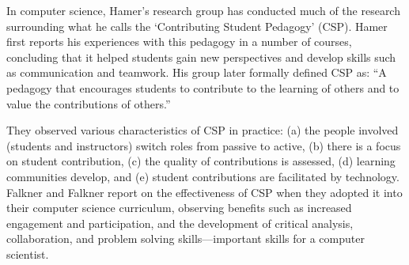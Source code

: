 
In computer science, Hamer's research group has conducted much of the research surrounding what he calls the `Contributing Student Pedagogy' (CSP). Hamer first reports his experiences \cite{hamer2006some} with this pedagogy in a number of courses, concluding that it helped students gain new perspectives and develop skills such as communication and teamwork. His group later formally defined CSP \cite{hamer2008contributing} as: ``A pedagogy that encourages students to contribute to the learning of others and to value the contributions of others.''

They observed various characteristics of CSP in practice: (a) the people involved (students and instructors) switch roles from passive to active, (b) there is a focus on student contribution, (c) the quality of contributions is assessed, (d) learning communities develop, and (e) student contributions are facilitated by technology. Falkner and Falkner \cite{falkner2012supporting} report on the effectiveness of CSP when they adopted it into their computer science curriculum, observing benefits such as increased engagement and participation, and the development of critical analysis, collaboration, and problem solving skills---important skills for a computer scientist.
%

